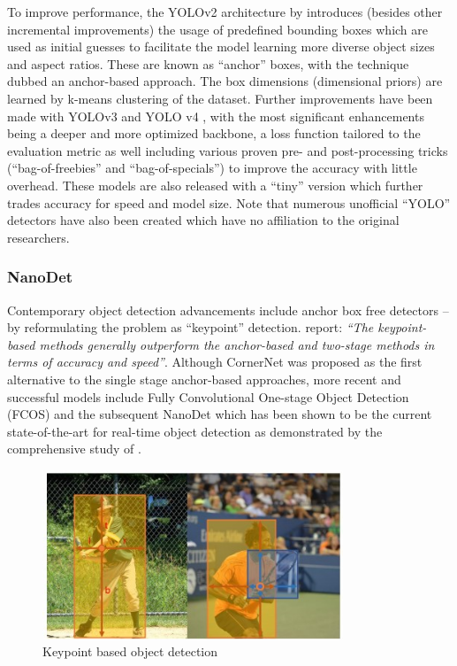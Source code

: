 \documentclass[a4paper,twoside,12pt]{report}
\begin{document}
To improve performance, the YOLOv2 architecture by \cite{yolov2} introduces (besides other incremental improvements) the usage of predefined bounding boxes which are used as initial guesses to facilitate the model learning more diverse object sizes and aspect ratios. These are known as ``anchor'' boxes, with the technique dubbed an anchor-based approach. The box dimensions (dimensional priors) are learned by k-means clustering of the dataset. Further improvements have been made with YOLOv3 \citep{yolov3} and YOLO v4 \citep{yolov4}, with the most significant enhancements being a deeper and more optimized backbone, a loss function tailored to the evaluation metric as well including various proven pre- and post-processing tricks (``bag-of-freebies'' and ``bag-of-specials'') to improve the accuracy with little overhead. These models are also released with a ``tiny'' version which further trades accuracy for speed and model size. Note that numerous unofficial ``YOLO'' detectors have also been created which have no affiliation to the original researchers.

\subsubsection{NanoDet}

Contemporary object detection advancements include anchor box free detectors -- by reformulating the problem as ``keypoint'' detection. \cite{comprehensive} report: \textit{``The keypoint-based methods generally outperform the anchor-based and two-stage methods in terms of accuracy and speed''}. Although CornerNet \citep{cornernet} was proposed as the first alternative to the single stage anchor-based approaches, more recent and successful models include Fully Convolutional One-stage Object Detection (FCOS) \citep{fcos} and the subsequent NanoDet \citep{nanodet} which has been shown to be the current state-of-the-art for real-time object detection as demonstrated by the comprehensive study of \cite{comprehensive}.

\begin{figure}[h!]
\begin{center}
\includegraphics[width=9cm]{images/keypointdetect.jpg}
\caption{Keypoint based object detection \citep{fcos}}
\label{fig:keypointdetect}
\end{center}
\end{figure}
\end{document}
